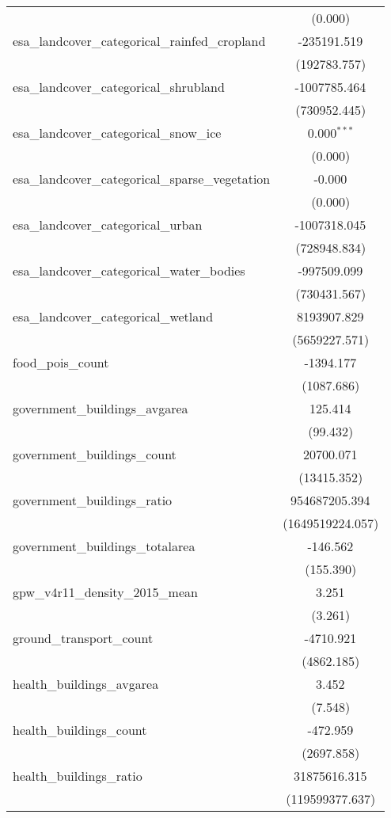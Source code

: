\begin{table}[!htbp]
\begin{tabular}{@{\extracolsep{5pt}}lc}
  & (0.000) \\
 esa_landcover_categorical_rainfed_cropland & -235191.519$^{}$ \\
  & (192783.757) \\
 esa_landcover_categorical_shrubland & -1007785.464$^{}$ \\
  & (730952.445) \\
 esa_landcover_categorical_snow_ice & 0.000$^{***}$ \\
  & (0.000) \\
 esa_landcover_categorical_sparse_vegetation & -0.000$^{}$ \\
  & (0.000) \\
 esa_landcover_categorical_urban & -1007318.045$^{}$ \\
  & (728948.834) \\
 esa_landcover_categorical_water_bodies & -997509.099$^{}$ \\
  & (730431.567) \\
 esa_landcover_categorical_wetland & 8193907.829$^{}$ \\
  & (5659227.571) \\
 food_pois_count & -1394.177$^{}$ \\
  & (1087.686) \\
 government_buildings_avgarea & 125.414$^{}$ \\
  & (99.432) \\
 government_buildings_count & 20700.071$^{}$ \\
  & (13415.352) \\
 government_buildings_ratio & 954687205.394$^{}$ \\
  & (1649519224.057) \\
 government_buildings_totalarea & -146.562$^{}$ \\
  & (155.390) \\
 gpw_v4r11_density_2015_mean & 3.251$^{}$ \\
  & (3.261) \\
 ground_transport_count & -4710.921$^{}$ \\
  & (4862.185) \\
 health_buildings_avgarea & 3.452$^{}$ \\
  & (7.548) \\
 health_buildings_count & -472.959$^{}$ \\
  & (2697.858) \\
 health_buildings_ratio & 31875616.315$^{}$ \\
  & (119599377.637) \\

\end{tabular}
\end{table}
